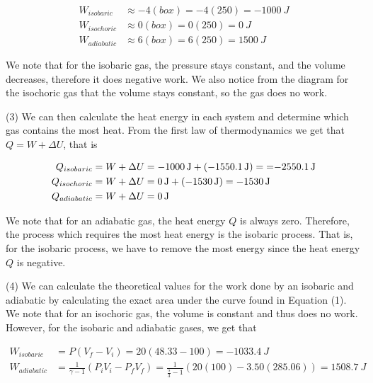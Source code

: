 \documentclass[12pt]{article}
\begin{document}
\begin{equation*}
    \begin{split}
        W_{isobaric} &\approx -4 (box) = -4(250) = \SI{-1000}{J} \\
        W_{isochoric} &\approx 0 (box) = 0(250) = \SI{0}{J} \\
        W_{adiabatic} &\approx 6 (box) = 6(250) = \SI{1500}{J}
    \end{split}
\end{equation*}

We note that for the isobaric gas, the pressure stays constant, and the volume decreases, therefore it does negative work. We also notice from the diagram for the isochoric gas that the volume stays constant, so the gas does no work.

\bigskip

(3) We can then calculate the heat energy in each system and determine which gas contains the most heat. From the first law of thermodynamics we get that $Q=W + \Delta U$, that is

\begin{equation*}
    \begin{split}
        Q_{isobaric} &= W + \Delta U =  \SI{-1000}{J} + (\SI{-1550.1}{J}) = \SI{=-2550.1}{J} \\
        Q_{isochoric} &= W + \Delta U =  \SI{0}{J} + (\SI{-1530}{J}) = \SI{-1530}{J} \\
        Q_{adiabatic} &= W + \Delta U = \SI{0}{J} \\
    \end{split}
\end{equation*}

We note that for an adiabatic gas, the heat energy $Q$ is always zero. Therefore, the process which requires the most heat energy is the isobaric process. That is, for the isobaric process, we have to remove the most energy since the heat energy $Q$ is negative.

\bigskip

(4) We can calculate the theoretical values for the work done by an isobaric and adiabatic by calculating the exact area under the curve found in Equation (1). We note that for an isochoric gas, the volume is constant and thus does no work. However, for the isobaric and adiabatic gases, we get that

\begin{equation*}
    \begin{split}
        W_{isobaric} &= P(V_f - V_i) = 20(48.33 - 100) = \SI{-1033.4}{J} \\
        W_{adiabatic} &= \frac{1}{\gamma - 1}\left(P_i V_i - P_f V_f\right) = \frac{1}{\frac{5}{3} - 1}\left(20 (100) - 3.50(285.06) \right) = \SI{1508.7}{J} \\
    \end{split}
\end{equation*}
\end{document}
